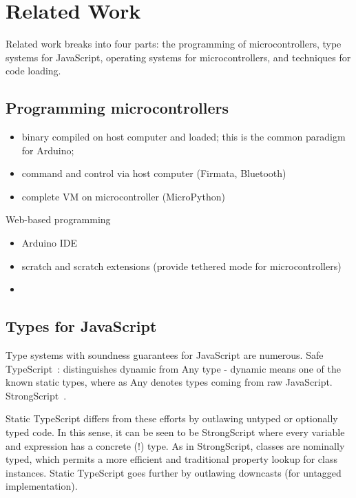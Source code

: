 \section{Related Work}
\label{sec:related}

Related work breaks into four parts: the programming of microcontrollers, 
type systems for JavaScript, operating systems
for microcontrollers, and techniques for code loading.

\subsection{Programming microcontrollers}

\begin{itemize}
\item binary compiled on host computer and loaded; this is the common paradigm for Arduino;
\item command and control via host computer (Firmata, Bluetooth)
\item complete VM on microcontroller (MicroPython)
\end{itemize}

Web-based programming

\begin{itemize}
\item Arduino IDE
\item scratch and scratch extensions (provide tethered mode for microcontrollers)
\item 
\end{itemize}

\subsection{Types for JavaScript}

Type systems with soundness guarantees for JavaScript are numerous. 
Safe TypeScript~\cite{SafeTypeScript15}: distinguishes dynamic from Any type - dynamic means
one of the known static types, where as Any denotes types coming
from raw JavaScript.
StrongScript~\cite{StrongScriptECOOP15}.

Static TypeScript differs from these efforts by outlawing untyped or optionally typed
code.  In this sense, it can be seen to be StrongScript where every variable and 
expression has a concrete (!) type.   As in StrongScript, classes are nominally typed,
which permits a more efficient and traditional property lookup for class instances. 
Static TypeScript goes further by outlawing downcasts (for untagged implementation).

